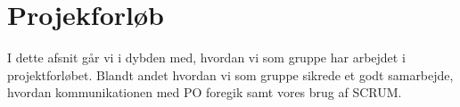 \section{Projekforløb}
\label{sec:projekt}
I dette afsnit går vi i dybden med, hvordan vi som gruppe har arbejdet i projektforløbet.
Blandt andet hvordan vi som gruppe sikrede et godt samarbejde, hvordan kommunikationen med PO foregik samt vores brug af SCRUM.



